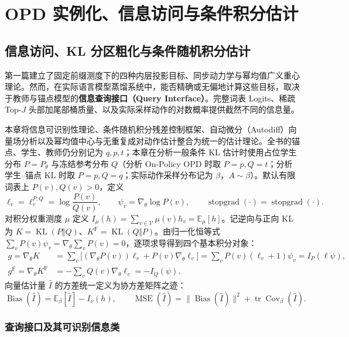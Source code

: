 \documentclass[lang=cn,scheme=chinese,openany]{elegantbook}
\newcommand{\E}{\mathbb E}
\newcommand{\KL}{\operatorname{KL}}
\newcommand{\sg}{\operatorname{stopgrad}}
\begin{document}
\part{OPD 实例化、信息访问与条件积分估计}

\chapter{信息访问、KL 分区粗化与条件随机积分估计}
\label{inf:chapter}
\label{est:chapter}

第一篇建立了固定前缀测度下的四种内层投影目标、同步动力学与幂均值广义重心理论。然而，在实际语言模型蒸馏系统中，能否精确或无偏地计算这些目标，取决于教师与锚点模型的\textbf{信息查询接口（Query Interface）}。完整词表 Logits、稀疏 Top-$J$ 头部加尾部桶质量、以及实际采样动作的对数概率提供截然不同的信息量。

本章将信息可识别性理论、条件随机积分残差控制框架、自动微分（Autodiff）向量场分析以及幂均值中心与无重复成对动作估计整合为统一的估计理论。全书的锚点、学生、教师仍分别记为 $q,p,t$；本章在分析一般条件 KL 估计时使用占位学生分布 $P=P_\theta$ 与冻结参考分布 $Q$（分析 On-Policy OPD 时取 $P=p,Q=t$；分析学生--锚点 KL 时取 $P=p,Q=q$；实际动作采样分布记为 $\beta$，$A\sim\beta$）。默认有限词表上 $P(v),Q(v)>0$，定义
\begin{equation}
\ell_v=\ell_v^{P,Q}=\log\frac{P(v)}{Q(v)},\qquad
\psi_v=\nabla_\theta\log P(v),\qquad
\sg(\cdot)=\operatorname{stopgrad}(\cdot).
\end{equation}
对积分权重测度 $\mu$ 定义 $I_\mu(h)=\sum_{v\in\mathcal V}\mu(v)h_v=\E_\mu[h]$。记逆向与正向 KL 为 $K=\KL(P\Vert Q)$、$K^{\mathrm F}=\KL(Q\Vert P)$。由归一化恒等式 $\sum_v P(v)\psi_v=\nabla_\theta\sum_v P(v)=0$，逐项求导得到四个基本积分对象：
\begin{align}
g=\nabla_\theta K
&=\sum_v\bigl[(\nabla_\theta P(v))\ell_v+P(v)\nabla_\theta\ell_v\bigr]
=\sum_v P(v)(\ell_v+1)\psi_v
=I_P(\ell\psi),\\
g^{\mathrm F}=\nabla_\theta K^{\mathrm F}
&=-\sum_v Q(v)\nabla_\theta\ell_v=-I_Q(\psi).
\end{align}
向量估计量 $\widehat I$ 的方差统一定义为协方差矩阵之迹：
\begin{equation}
\operatorname{Bias}(\widehat I)=\E_\beta[\widehat I]-I_\nu(h),\qquad
\operatorname{MSE}(\widehat I)=\|\operatorname{Bias}(\widehat I)\|^2+\operatorname{tr}\operatorname{Cov}_\beta(\widehat I).
\end{equation}

\section{查询接口及其可识别信息类}
\label{inf:access}
\label{est:targets}
\end{document}
